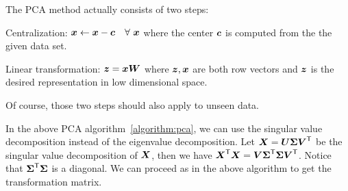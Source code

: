 \begin{re}
    The PCA method actually consists of two steps:
    \begin{compactenum}
        \item Centralization: $\boldsymbol{x} \gets \boldsymbol{x} -\boldsymbol{c}\quad\forall~\boldsymbol{x}$ where the center $\boldsymbol{c}$ is computed
        from the the given data set.
        \item Linear transformation: $\boldsymbol{z} = \boldsymbol{x} \boldsymbol{W}$ where $\boldsymbol{z}, \boldsymbol{x}$ are both row vectors and
        $\boldsymbol{z}$ is the desired representation in low dimensional space.
    \end{compactenum}
    Of course, those two steps should also apply to unseen data.
\end{re}

\begin{re}
    In the above PCA algorithm~\ref{algorithm:pca}, we can use the singular value decomposition instead of the 
    eigenvalue decomposition. Let $\boldsymbol{X} = \boldsymbol{U}\boldsymbol{\Sigma}{\boldsymbol{V}}^\mathsf{T}$ be the singular value decomposition of 
    $\boldsymbol{X}$, then we have ${\boldsymbol{X}}^\mathsf{T}\boldsymbol{X} = \boldsymbol{V} {\boldsymbol{\Sigma}}^\mathsf{T}\boldsymbol{\Sigma} {\boldsymbol{V}}^\mathsf{T}$. Notice that
    ${\boldsymbol{\Sigma}}^\mathsf{T}\boldsymbol{\Sigma}$ is a diagonal. We can proceed as in the above algorithm to get the
    transformation matrix.
\end{re}

